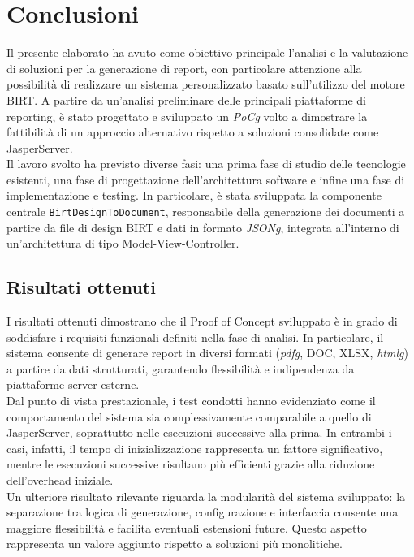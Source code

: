 \chapter{Conclusioni}
\label{cap:conclusioni}

Il presente elaborato ha avuto come obiettivo principale l'analisi e la valutazione di soluzioni per la generazione di report, con particolare attenzione alla possibilità di realizzare un sistema personalizzato basato sull'utilizzo del motore BIRT. A partire da un'analisi preliminare delle principali piattaforme di reporting, è stato progettato e sviluppato un \emph{\gls{PoCg}} volto a dimostrare la fattibilità di un approccio alternativo rispetto a soluzioni consolidate come JasperServer.\\
Il lavoro svolto ha previsto diverse fasi: una prima fase di studio delle tecnologie esistenti, una fase di progettazione dell'architettura software e infine una fase di implementazione e testing. In particolare, è stata sviluppata la componente centrale \texttt{BirtDesignToDocument}, responsabile della generazione dei documenti a partire da file di design BIRT e dati in formato \emph{\gls{JSONg}}, integrata all'interno di un'architettura di tipo Model-View-Controller.

\section{Risultati ottenuti}
I risultati ottenuti dimostrano che il Proof of Concept sviluppato è in grado di soddisfare i requisiti funzionali definiti nella fase di analisi. In particolare, il sistema consente di generare report in diversi formati (\emph{\gls{pdfg}}, DOC, XLSX, \emph{\gls{htmlg}}) a partire da dati strutturati, garantendo flessibilità e indipendenza da piattaforme server esterne.\\
Dal punto di vista prestazionale, i test condotti hanno evidenziato come il comportamento del sistema sia complessivamente comparabile a quello di JasperServer, soprattutto nelle esecuzioni successive alla prima. In entrambi i casi, infatti, il tempo di inizializzazione rappresenta un fattore significativo, mentre le esecuzioni successive risultano più efficienti grazie alla riduzione dell'overhead iniziale.\\
Un ulteriore risultato rilevante riguarda la modularità del sistema sviluppato: la separazione tra logica di generazione, configurazione e interfaccia consente una maggiore flessibilità e facilita eventuali estensioni future. Questo aspetto rappresenta un valore aggiunto rispetto a soluzioni più monolitiche.

